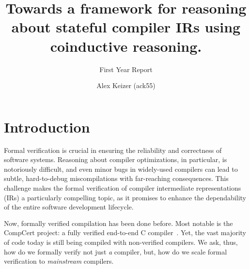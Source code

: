 \documentclass[a4paper]{scrartcl}
\begin{document}
\title{Towards a framework for reasoning about stateful compiler IRs 
using coinductive reasoning.}                                      
\subtitle{First Year Report}

\author{Alex Keizer \small{(ack55)}}
\date{}



\maketitle


\section{Introduction}

Formal verification is crucial in ensuring the reliability and
correctness of software systems. 
Reasoning about compiler optimizations, in particular, is notoriously difficult, 
and even minor bugs in widely-used compilers can lead to subtle, hard-to-debug miscompilations
with far-reaching consequences. 
This challenge makes the formal verification of compiler intermediate representations (IRs) a
particularly compelling topic, 
as it promises to enhance the dependability of the entire software development lifecycle.

Now, formally verified compilation has been done before.
Most notable is the CompCert project: a fully verified end-to-end C compiler~\cite{leroyCompCertFormallyVerified}.
Yet, the vast majority of
code today is still being compiled with non-verified compilers. We ask,
thus, how do we formally verify not just \emph{a} compiler, but, how do we
scale formal verification to \emph{mainstream} compilers.
\end{document}
